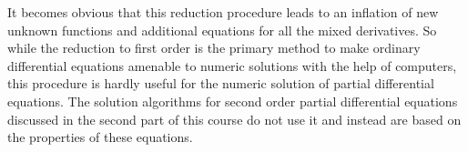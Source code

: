 It becomes obvious that this reduction procedure leads to an inflation of
new unknown functions and additional equations for all the mixed
derivatives.
So while the reduction to first order is the primary method to make
ordinary differential equations amenable to numeric solutions with the
help of computers, this procedure is hardly useful for the numeric
solution of partial differential equations.
The solution algorithms for second order partial differential equations
discussed in the second part of this course do not use it and instead
are based on the properties of these equations.

